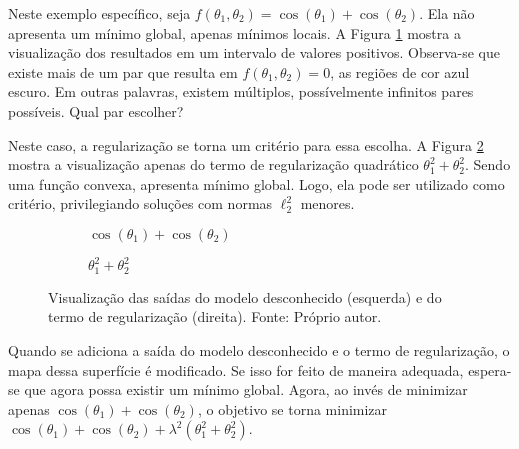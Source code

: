 Neste exemplo específico, seja $f(\theta_1, \theta_2) = \cos(\theta_1) + \cos(\theta_2)$. Ela não apresenta um mínimo global, apenas mínimos locais. A Figura \ref{fig:visualreg1a} mostra a visualização dos resultados em um intervalo de valores positivos. Observa-se que existe mais de um par que resulta em $f(\theta_1, \theta_2) = 0$, as regiões de cor azul escuro. Em outras palavras, existem múltiplos, possívelmente infinitos pares possíveis. Qual par escolher?

Neste caso, a regularização se torna um critério para essa escolha. A Figura \ref{fig:visualreg1b} mostra a visualização apenas do termo de regularização quadrático $\theta_1^2 + \theta_2^2$. Sendo uma função convexa, apresenta mínimo global. Logo, ela pode ser utilizado como critério, privilegiando soluções com normas $\ell_2^2$ menores.  

 \begin{figure}[H]
     \centering
   \begin{subfigure}[b]{0.49\textwidth}
         \centering
         \caption{$\cos(\theta_1) + \cos(\theta_2)$}
                  \label{fig:visualreg1a}
      \end{subfigure}
     \hfill
     \begin{subfigure}[b]{0.49\textwidth}
         \centering
         \caption{$\theta_1^2 + \theta_2^2$}
                  \label{fig:visualreg1b}
       \end{subfigure}
     \caption[Visualização das saídas do modelo desconhecido (esquerda) e do termo de regularização (direita).]{Visualização das saídas do modelo desconhecido (esquerda) e do termo de regularização (direita). Fonte: Próprio autor.}
     \label{fig:visualreg1}
 \end{figure}

Quando se adiciona a saída do modelo desconhecido e o termo de regularização, o mapa dessa superfície é modificado. Se isso for feito de maneira adequada, espera-se que agora possa existir um mínimo global. Agora, ao invés de minimizar apenas $\cos(\theta_1) + \cos(\theta_2)$, o objetivo se torna minimizar $\cos(\theta_1) + \cos(\theta_2) + \lambda^2(\theta_1^2 + \theta_2^2)$. 

